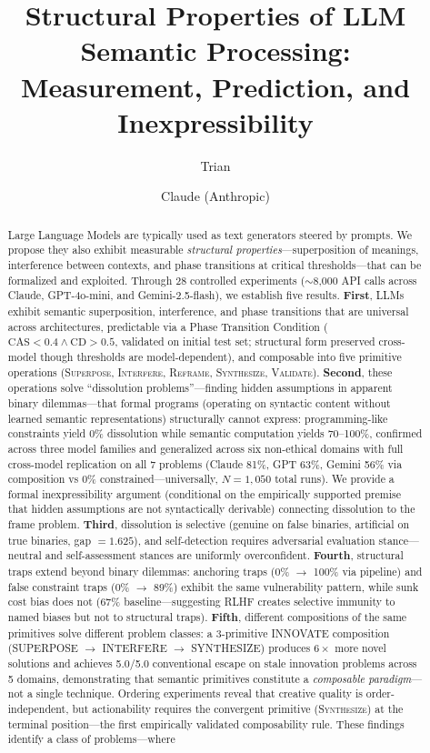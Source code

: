 \documentclass[11pt,a4paper]{article}
\title{Structural Properties of LLM Semantic Processing:\\ Measurement, Prediction, and Inexpressibility}
\author{Trian \and Claude (Anthropic)}
\date{}
\newcommand{\CAS}{\mathrm{CAS}}
\newcommand{\CD}{\mathrm{CD}}
\begin{document}
\maketitle

\begin{abstract}
Large Language Models are typically used as text generators steered by prompts. We propose they also exhibit measurable \emph{structural properties}---superposition of meanings, interference between contexts, and phase transitions at critical thresholds---that can be formalized and exploited. Through 28 controlled experiments ($\sim$8,000 API calls across Claude, GPT-4o-mini, and Gemini-2.5-flash), we establish five results. \textbf{First}, LLMs exhibit semantic superposition, interference, and phase transitions that are universal across architectures, predictable via a Phase Transition Condition ($\CAS < 0.4 \wedge \CD > 0.5$, validated on initial test set; structural form preserved cross-model though thresholds are model-dependent), and composable into five primitive operations (\textsc{Superpose}, \textsc{Interfere}, \textsc{Reframe}, \textsc{Synthesize}, \textsc{Validate}). \textbf{Second}, these operations solve ``dissolution problems''---finding hidden assumptions in apparent binary dilemmas---that formal programs (operating on syntactic content without learned semantic representations) structurally cannot express: programming-like constraints yield 0\% dissolution while semantic computation yields 70--100\%, confirmed across three model families and generalized across six non-ethical domains with full cross-model replication on all 7 problems (Claude 81\%, GPT 63\%, Gemini 56\% via composition vs 0\% constrained---universally, $N=1{,}050$ total runs). We provide a formal inexpressibility argument (conditional on the empirically supported premise that hidden assumptions are not syntactically derivable) connecting dissolution to the frame problem. \textbf{Third}, dissolution is selective (genuine on false binaries, artificial on true binaries, gap $= 1.625$), and self-detection requires adversarial evaluation stance---neutral and self-assessment stances are uniformly overconfident. \textbf{Fourth}, structural traps extend beyond binary dilemmas: anchoring traps (0\% $\to$ 100\% via pipeline) and false constraint traps (0\% $\to$ 89\%) exhibit the same vulnerability pattern, while sunk cost bias does not (67\% baseline---suggesting RLHF creates selective immunity to named biases but not to structural traps). \textbf{Fifth}, different compositions of the same primitives solve different problem classes: a 3-primitive INNOVATE composition (SUPERPOSE $\to$ INTERFERE $\to$ SYNTHESIZE) produces $6\times$ more novel solutions and achieves 5.0/5.0 conventional escape on stale innovation problems across 5 domains, demonstrating that semantic primitives constitute a \emph{composable paradigm}---not a single technique. Ordering experiments reveal that creative quality is order-independent, but actionability requires the convergent primitive (\textsc{Synthesize}) at the terminal position---the first empirically validated composability rule. These findings identify a class of problems---where 
\end{abstract}
\end{document}

